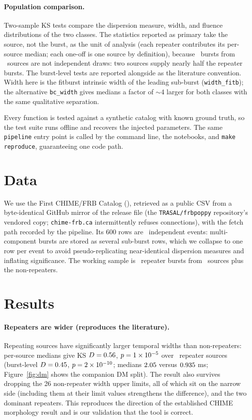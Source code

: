 \documentclass[twocolumn]{aastex631}
\newcommand{\code}[1]{\texttt{#1}}
\begin{document}
\paragraph{Population comparison.} Two-sample KS tests compare the dispersion measure,
width, and fluence distributions of the two classes. The statistics reported as primary
take the source, not the burst, as the unit of analysis (each repeater contributes its
per-source median; each one-off is one source by definition), because \nRepeaterBursts\
bursts from \nRepeaterSources\ sources are not independent draws: two sources supply
nearly half the repeater bursts. The burst-level tests are reported alongside as the literature
convention. Width here is the fitburst intrinsic width of the leading sub-burst
(\code{width\_fitb}); the alternative \code{bc\_width} gives medians a factor of
$\sim$4 larger for both classes with the same qualitative separation.

Every function is tested against a synthetic catalog with known ground truth, so the test
suite runs offline and recovers the injected parameters. The same \code{pipeline} entry
point is called by the command line, the notebooks, and \code{make reproduce}, guaranteeing
one code path.

\section{Data}
We use the First CHIME/FRB Catalog \citep{chimecat1} (\code{\catalogSource}), retrieved
as a public CSV from a byte-identical GitHub mirror of the release file (the
\code{TRASAL/frbpoppy} repository's vendored copy; \code{chime-frb.ca} intermittently
refuses connections), with the fetch path recorded by the pipeline. Its 600 rows are
\nBursts\ independent events: multi-component bursts are stored as several
sub-burst rows, which we collapse to one row per event to avoid pseudo-replicating
near-identical dispersion measures and inflating significance. The working sample is
\nRepeaterBursts\ repeater bursts from \nRepeaterSources\ sources plus the non-repeaters.

\section{Results}
\paragraph{Repeaters are wider (reproduces the literature).} Repeating sources have
significantly larger temporal widths than non-repeaters: per-source medians give KS
$D=0.56$, $p=1\times10^{-5}$ over \ksWidthNSrc\ repeater sources (burst-level
$D=0.45$, $p=2\times10^{-10}$; medians $2.05$ versus $0.935$ ms;
Figure~\ref{fig:dm} shows the companion DM split). The result also survives dropping the
26 non-repeater width upper limits, all of which sit on the narrow side (including them at
their limit values strengthens the difference), and the two dominant repeaters. This
reproduces the direction of the established CHIME morphology result \citep{pleunis2021}
and is our validation that the tool is correct.
\end{document}
